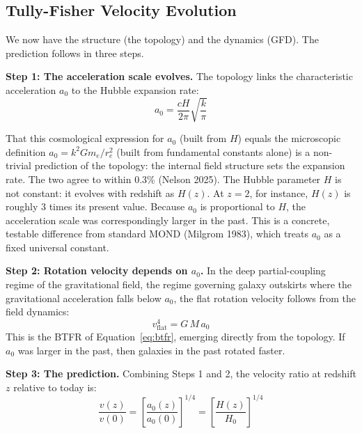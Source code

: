\documentclass[aps,prd,preprint,superscriptaddress,showpacs,preprintnumbers,amsmath,amssymb,nofootinbib]{revtex4-2}
\begin{document}
\subsection{Tully-Fisher Velocity Evolution}
\label{subsec:prediction}

We now have the structure (the topology) and the dynamics (GFD). The prediction follows in three steps.

\textbf{Step 1: The acceleration scale evolves.} The topology links the characteristic acceleration $a_0$ to the Hubble expansion rate:
\begin{equation}
a_0 = \frac{cH}{2\pi}\sqrt{\frac{k}{\pi}}
\label{eq:a0H}
\end{equation}

That this cosmological expression for $a_0$ (built from $H$) equals the microscopic definition $a_0 = k^2 G m_e/r_e^2$ (built from fundamental constants alone) is a non-trivial prediction of the topology: the internal field structure sets the expansion rate. The two agree to within 0.3\% (Nelson 2025). The Hubble parameter $H$ is not constant: it evolves with redshift as $H(z)$. At $z = 2$, for instance, $H(z)$ is roughly 3 times its present value. Because $a_0$ is proportional to $H$, the acceleration scale was correspondingly larger in the past. This is a concrete, testable difference from standard MOND (Milgrom 1983), which treats $a_0$ as a fixed universal constant.

\textbf{Step 2: Rotation velocity depends on $a_0$.} In the deep partial-coupling regime of the gravitational field, the regime governing galaxy outskirts where the gravitational acceleration falls below $a_0$, the flat rotation velocity follows from the field dynamics:
\begin{equation}
v_{\mathrm{flat}}^4 = G\,M\,a_0
\label{eq:vflat}
\end{equation}
This is the BTFR of Equation~\ref{eq:btfr}, emerging directly from the topology. If $a_0$ was larger in the past, then galaxies in the past rotated faster.

\textbf{Step 3: The prediction.} Combining Steps 1 and 2, the velocity ratio at redshift $z$ relative to today is:
\begin{equation}
\frac{v(z)}{v(0)} = \left[\frac{a_0(z)}{a_0(0)}\right]^{1/4} = \left[\frac{H(z)}{H_0}\right]^{1/4}
\label{eq:ratio_naive}
\end{equation}
\end{document}
